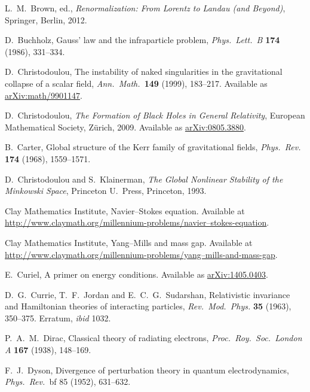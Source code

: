 \documentclass{article}
\begin{document}
\begin{thebibliography}{10}
 L.\ M.\ Brown, ed., \textsl{Renormalization: From Lorentz to Landau (and Beyond)}, Springer, Berlin, 2012.

 D.\ Buchholz, Gauss' law and the infraparticle problem, 
\textsl{Phys.\ Lett.\ B} \textbf{174} (1986), 331--334.

 D.\ Christodoulou, The instability of naked singularities in the gravitational collapse of a scalar field, \textsl{Ann.\ Math.\ }\textbf{149} (1999), 183--217.  Available as \href{http://arxiv.org/abs/math/9901147}{arXiv:math/9901147}.

 D.\ Christodoulou, \textsl{The Formation of Black Holes in General Relativity}, European Mathematical Society, Z\"urich, 2009.  Available as \href{http://arxiv.org/abs/0805.3880}{arXiv:0805.3880}.

 B.\ Carter, Global structure of the Kerr family of gravitational fields, \textsl{Phys.\ Rev.} \textbf{174} (1968), 1559--1571.

 D.\ Christodoulou and S.\ Klainerman, \textsl{The Global Nonlinear Stability of the Minkowski Space}, Princeton U.\ Press, Princeton, 1993.

 Clay Mathematics Institute, Navier--Stokes equation.  Available at
\href{http://www.claymath.org/millennium-problems/navier\%E2\%80\%93stokes-equation}{http://www.claymath.org/millennium-problems/navier--stokes-equation}.

 Clay Mathematics Institute, Yang--Mills and mass gap.  Available at \break \href{http://www.claymath.org/millennium-problems/yang\%E2\%80\%93mills-and-mass-gap}{http://www.claymath.org/millennium-problems/yang--mills-and-mass-gap}.

 E.\ Curiel, A primer on energy conditions.  Available as
\href{https://arxiv.org/abs/1405.0403}{arXiv:1405.0403}.

 D.\ G.\ Currie, T.\ F.\ Jordan and E.\ C.\ G.\ Sudarshan, Relativistic invariance and Hamiltonian theories of interacting particles, \textsl{Rev.\  Mod.\ Phys.} {\bf 35} (1963), 350--375.  Erratum, \emph{ibid} 1032.

 P.\ A.\ M.\ Dirac, Classical theory of radiating electrons, \textsl{Proc.\ Roy.\ Soc.\ London A} \textbf{167} (1938), 148--169.

 F.\ J.\ Dyson, Divergence of perturbation theory in quantum electrodynamics, \textsl{Phys.\ Rev.\ }{bf 85} (1952), 631--632.


\end{thebibliography}
\end{document}
